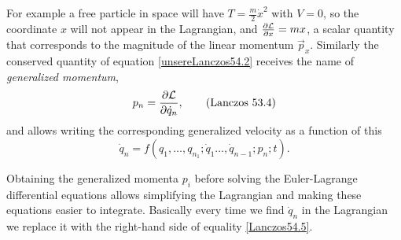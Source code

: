 \documentclass[12pt, english, a4paper]{article}
\begin{document}
For example a free particle in space will have \(T= \frac{m}{2} \dot{x}^2\) with \(V = 0\), so the coordinate \(x\) will not appear in the Lagrangian, and \(\pdv{\mathcal{L}}{x}= m x\), a scalar quantity that corresponds to the magnitude of the linear momentum \(\vec{p}_x\).
Similarly the conserved quantity of equation \eqref{unsereLanczos54.2} receives the name of \emph{generalized momentum},
\begin{equation}\label{Lanczos53.4}
	p_n= \pdv{\mathcal{L}}{\dot{q}_n},
    \tag{Lanczos 53.4}
\end{equation}
and allows writing the corresponding generalized velocity as a function of this
\begin{equation}\label{Lanczos54.5}
	\dot{q}_n= f(q_1, \ldots, q_{n_1};\dot{q}_1 \ldots, \dot{q}_{n-1};p_n;t).
    \tag{Lanczos 54.5}
\end{equation}

Obtaining the generalized momenta \(p_i\) before solving the Euler-Lagrange differential equations allows simplifying the Lagrangian and making these equations easier to integrate.
Basically every time we find \(\dot{q}_n\) in the Lagrangian we replace it with the right-hand side of equality \eqref{Lanczos54.5}.
\end{document}
